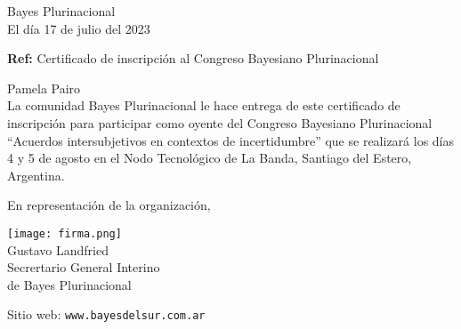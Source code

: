 \documentclass[a4paper,11pt]{letter}
\begin{document}
\begin{letter}{\phantom{.}}


\begin{flushright}
Bayes Plurinacional \\
El día 17 de julio del 2023
\end{flushright}

\vspace{1cm}
\noindent

\hfill \textbf{Ref:} Certificado de inscripción al Congreso Bayesiano Plurinacional\\

\vspace{1cm}

\noindent Pamela Pairo \\ [0.3cm]

\hspace{1cm} La comunidad Bayes Plurinacional le hace entrega de  este certificado de inscripción para participar como oyente del Congreso Bayesiano Plurinacional ``Acuerdos intersubjetivos en contextos de incertidumbre'' que se realizará los días 4 y 5 de agosto en el Nodo Tecnológico de La Banda, Santiago del Estero, Argentina.

\vspace{0.3cm}

\hspace{1cm} En representación de la organización,


\begin{flushleft}
\hfill \texttt{[image: firma.png]}\hspace{2cm}\phantom{.} \\[0cm]
\hfill Gustavo Landfried \hspace{2.5cm}\phantom{.}\\ \small
\hfill Secrertario General Interino \hspace{2.5cm}\phantom{.}\\
\hfill de Bayes Plurinacional \hspace{2.5cm}\phantom{.}\\
\end{flushleft}



 \vspace{0.8cm}
\small

 Sitio web: \texttt{www.bayesdelsur.com.ar}



 \end{letter}
\end{document}
